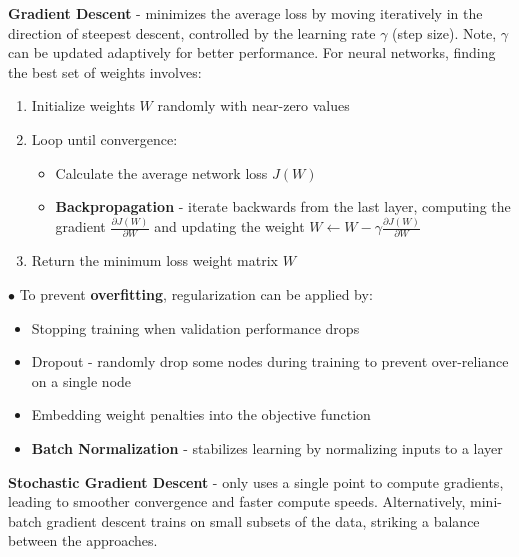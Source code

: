 \documentclass[letterpaper, 10.5pt,landscape]{article}
\begin{document}
\begin{multicols*}{3}
\smallskip
\textbf{Gradient Descent} - minimizes the average loss by moving iteratively in the direction of steepest descent, controlled by the learning rate $\gamma$ (step size). Note, $\gamma$ can be updated adaptively for better performance. For neural networks, finding the best set of weights involves:

\begin{enumerate}[leftmargin=5mm]
\vspace{-3pt}
\item Initialize weights $W$ randomly with near-zero values
\vspace{-3pt}
\item Loop until convergence:
    \vspace{-3pt}
    \begin{itemize}[label={--},leftmargin=4mm]
    \vspace{-3pt}
    \item Calculate the average network loss $J(W)$
    \vspace{-3pt}
    \item \textbf{Backpropagation} - iterate backwards from the last layer, computing the gradient $\frac{\partial J(W)}{\partial W}$ and updating the weight $W \leftarrow W - \gamma \frac{\partial J(W)}{\partial W}$
    \vspace{-3pt}
    \end{itemize}
    \vspace{-3pt}
\item Return the minimum loss weight matrix $W$
\vspace{-3pt}
\end{enumerate}

$\bullet$ To prevent \textbf{overfitting}, regularization can be applied by:
\vspace{-3pt}
\begin{itemize}[label={--},leftmargin=6mm]
\itemsep -.4mm
\item Stopping training when validation performance drops
\item Dropout - randomly drop some nodes during training to prevent over-reliance on a single node
\item Embedding weight penalties into the objective function
\item \textbf{Batch Normalization} - stabilizes learning by normalizing inputs to a layer
\end{itemize}


\textbf{Stochastic Gradient Descent} - only uses a single point to compute gradients, leading to smoother convergence and faster compute speeds. Alternatively, mini-batch gradient descent trains on small subsets of the data, striking a balance between the approaches.


\end{multicols*}
\end{document}
